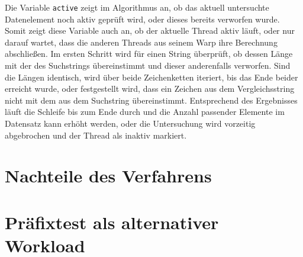 Die Variable \texttt{active} zeigt im Algorithmus an, ob das aktuell untersuchte Datenelement noch aktiv geprüft wird, oder dieses bereits verworfen wurde.
Somit zeigt diese Variable auch an, ob der aktuelle Thread aktiv läuft, oder nur darauf wartet, dass die anderen Threads aus seinem Warp ihre Berechnung abschließen.
Im ersten Schritt wird für einen String überprüft, ob dessen Länge mit der des Suchstrings übereinstimmt und dieser anderenfalls verworfen.
Sind die Längen identisch, wird über beide Zeichenketten iteriert, bis das Ende beider erreicht wurde, oder festgestellt wird, dass ein Zeichen aus dem Vergleichsstring nicht mit dem aus dem Suchstring übereinstimmt.
Entsprechend des Ergebnisses läuft die Schleife bis zum Ende durch und die Anzahl passender Elemente im Datensatz kann erhöht werden, oder die Untersuchung wird vorzeitig abgebrochen und der Thread als inaktiv markiert.


\section{Nachteile des Verfahrens}

\section{Präfixtest als alternativer Workload}
